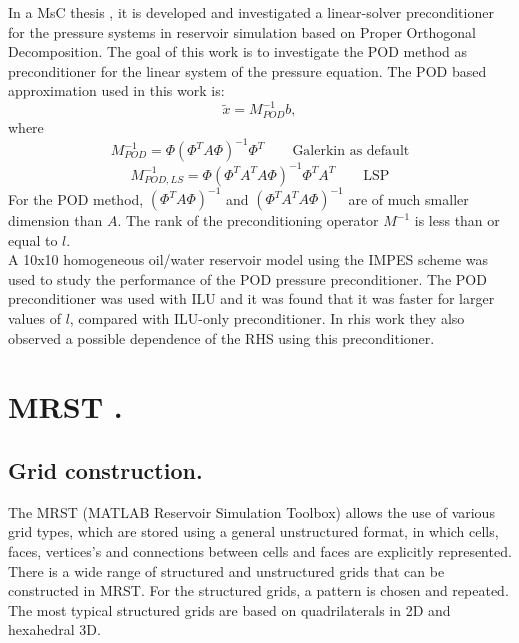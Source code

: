\documentclass[a4paper,10pt]{report}
\begin{document}
In a MsC thesis \cite{Jiang13}, it is developed and investigated a linear-solver preconditioner for the pressure systems 
in reservoir simulation based on Proper Orthogonal Decomposition.
The goal of this work is to investigate the POD method as preconditioner for the linear system of the pressure equation.
The POD based approximation used in this work is:
$$\tilde{x}=M^{-1}_{POD}b,$$ where
\begin{equation}
 M^{-1}_{POD}=\Phi(\Phi^TA\Phi)^{-1}\Phi^T \qquad \text{Galerkin as default}
\end{equation}
\begin{equation}
 M^{-1}_{POD,LS}=\Phi(\Phi^TA^TA\Phi)^{-1}\Phi^TA^T \qquad \text{LSP}
\end{equation}
For the POD method, $(\Phi^TA\Phi)^{-1}$ and $(\Phi^TA^TA\Phi)^{-1}$ are of much smaller 
dimension than $A$.
The rank of the preconditioning operator $M^{-1}$ is less than or equal to $l$.\\
A 10x10 homogeneous oil/water reservoir model using the IMPES scheme was used to study the performance of
the POD pressure preconditioner. The POD preconditioner was used with ILU and it was found that it was
faster for larger values of $l$, compared with ILU-only preconditioner. In rhis work they also observed a possible dependence
of the RHS using this preconditioner.
\appendix
\chapter{MRST \cite{Lie13}.}
\section*{Grid construction.}
The MRST (MATLAB Reservoir Simulation Toolbox) allows the use of various grid types, which are stored using a general unstructured
format, in which cells, faces, vertices's and connections between cells and faces are explicitly
represented. \\
There is a wide range of structured and unstructured grids that can be constructed in MRST.
For the structured grids, a pattern is chosen and repeated. The most typical structured grids are 
based on quadrilaterals in 2D and hexahedral 3D.
\end{document}
